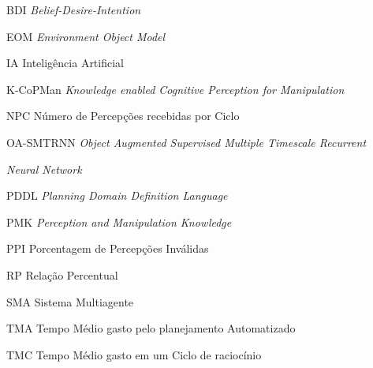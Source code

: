
\begin{siglas}
  \item[ BDI ] \hspace{0.7cm} \emph{Belief-Desire-Intention}
  \item[ EOM ] \hspace{0.7cm} \textit{Environment Object Model}
  \item[ IA ] \hspace{0.7cm} Inteligência Artificial
  \item[ K-CoPMan ] \hspace{0.4cm} \textit{Knowledge enabled Cognitive Perception for Manipulation}
  \item[ NPC ] \hspace{0.7cm} Número de Percepções recebidas por Ciclo
  \item[ OA-SMTRNN ] \textit{Object Augmented Supervised Multiple Timescale Recurrent}
  
  \hspace{0.7cm} \textit{Neural Network}
  \item[ PDDL ] \hspace{0.7cm} \textit{Planning Domain Definition Language}
  \item[ PMK ] \hspace{0.7cm} \textit{Perception and Manipulation Knowledge}
  \item[ PPI ] \hspace{0.7cm} Porcentagem de Percepções Inválidas
  \item[ RP ] \hspace{0.7cm} Relação Percentual
  \item[ SMA ] \hspace{0.7cm} Sistema Multiagente
  \item[ TMA ] \hspace{0.7cm} Tempo Médio gasto pelo planejamento Automatizado
  \item[ TMC ] \hspace{0.7cm} Tempo Médio gasto em um Ciclo de raciocínio
\end{siglas}